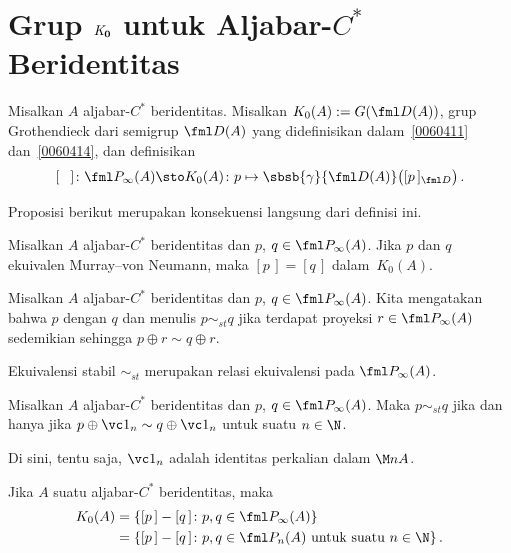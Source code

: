 \section{Grup $\mathbf{\emph{K}_0}$ untuk Aljabar-$C^*$ Beridentitas}

\begin{defn} Misalkan $A$ aljabar-$C^*$ beridentitas. Misalkan
$K_0(A) := G(\fml D(A))$, grup Grothendieck dari semigrup $\fml D(A)$ yang didefinisikan dalam~\ref{0060411} dan~\ref{0060414},
dan definisikan
   \[ [\hphantom{P}]\colon \fml P_\infty(A) \sto K_0(A)
           \colon p \mapsto \sbsb{\gamma}{\fml D(A)}\bigl([p\,]_{\fml D}\bigr)\,. \]
\end{defn}

Proposisi berikut merupakan konsekuensi langsung dari definisi ini.

\begin{prop}\label{0062188fa} Misalkan $A$ aljabar-$C^*$ beridentitas dan $p$, $q \in \fml P_\infty(A)$. Jika $p$ dan $q$
ekuivalen Murray--von Neumann, maka $[p\,] = [q\,]$ dalam~$K_0(A)$.
\end{prop}

\begin{defn} Misalkan $A$ aljabar-$C^*$ beridentitas dan $p$, $q \in \fml P_\infty(A)$. Kita mengatakan bahwa $p$
 dengan $q$ dan menulis
$p \sim_{st} q$ jika terdapat proyeksi $r \in \fml P_\infty(A)$ sedemikian sehingga $p \oplus r \sim q \oplus r$.
\end{defn}

\begin{prop} Ekuivalensi stabil $\sim_{st}$ merupakan relasi ekuivalensi pada $\fml P_\infty(A)$.
\end{prop}

\begin{prop} Misalkan $A$ aljabar-$C^*$ beridentitas dan $p$, $q \in \fml P_\infty(A)$. Maka $p
\sim_{st} q$ jika dan hanya jika $p \oplus \vc 1_n \sim q \oplus \vc 1_n$ untuk suatu $n \in \N$.
\end{prop}

Di sini, tentu saja, $\vc 1_n$ adalah identitas perkalian dalam $\M nA$.

\begin{prop}\label{0062224} Jika $A$ suatu
aljabar-$C^*$ beridentitas, maka
   \begin{align*}
         K_0(A) &= \{ [p\,] - [q\,]\colon p,q \in \fml P_\infty(A)\}  \\
                &= \{ [p\,] - [q\,]\colon  p,q \in \fml P_n(A) \text{ untuk suatu $n \in \N$}\}\,.
   \end{align*}
\end{prop}

